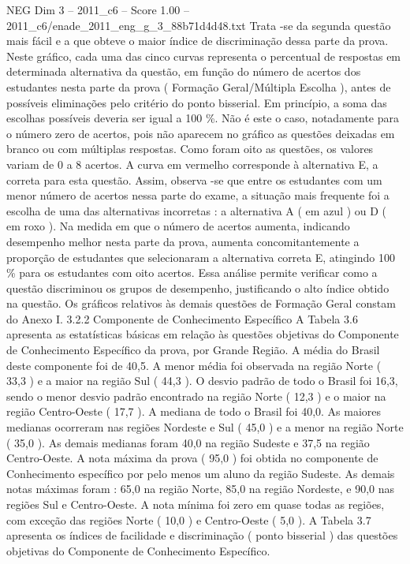 \begin{textsample}{NEG Dim 3 – 2011\_c6 – Score 1.00 – 2011\_c6/enade\_2011\_eng\_g\_3\_88b71d4d48.txt}
Trata -se da segunda questão mais fácil e a que obteve o maior índice de discriminação dessa parte da prova.
Neste gráfico, cada uma das cinco curvas representa o percentual de respostas em determinada alternativa da questão, em função do número de acertos dos estudantes nesta parte da prova ( Formação Geral/Múltipla Escolha ), antes de possíveis eliminações pelo critério do ponto bisserial.
Em princípio, a soma das escolhas possíveis deveria ser igual a 100 \%.
Não é este o caso, notadamente para o número zero de acertos, pois não aparecem no gráfico as questões deixadas em branco ou com múltiplas respostas.
Como foram oito as questões, os valores variam de 0 a 8 acertos.
A curva em vermelho corresponde à alternativa E, a correta para esta questão.
Assim, observa -se que entre os estudantes com um menor número de acertos nessa parte do exame, a situação mais frequente foi a escolha de uma das alternativas incorretas : a alternativa A ( em azul ) ou D ( em roxo ).
Na medida em que o número de acertos aumenta, indicando desempenho melhor nesta parte da prova, aumenta concomitantemente a proporção de estudantes que selecionaram a alternativa correta E, atingindo 100 \% para os estudantes com oito acertos.
Essa análise permite verificar como a questão discriminou os grupos de desempenho, justificando o alto índice obtido na questão.
Os gráficos relativos às demais questões de Formação Geral constam do Anexo I. 3.2.2 Componente de Conhecimento Específico A Tabela 3.6 apresenta as estatísticas básicas em relação às questões objetivas do Componente de Conhecimento Específico da prova, por Grande Região.
A média do Brasil deste componente foi de 40,5.
A menor média foi observada na região Norte ( 33,3 ) e a maior na região Sul ( 44,3 ).
O desvio padrão de todo o Brasil foi 16,3, sendo o menor desvio padrão encontrado na região Norte ( 12,3 ) e o maior na região Centro-Oeste ( 17,7 ).
A mediana de todo o Brasil foi 40,0.
As maiores medianas ocorreram nas regiões Nordeste e Sul ( 45,0 ) e a menor na região Norte ( 35,0 ).
As demais medianas foram 40,0 na região Sudeste e 37,5 na região Centro-Oeste.
A nota máxima da prova ( 95,0 ) foi obtida no componente de Conhecimento específico por pelo menos um aluno da região Sudeste.
As demais notas máximas foram : 65,0 na região Norte, 85,0 na região Nordeste, e 90,0 nas regiões Sul e Centro-Oeste.
A nota mínima foi zero em quase todas as regiões, com exceção das regiões Norte ( 10,0 ) e Centro-Oeste ( 5,0 ).
A Tabela 3.7 apresenta os índices de facilidade e discriminação ( ponto bisserial ) das questões objetivas do Componente de Conhecimento Específico.

\end{textsample}
